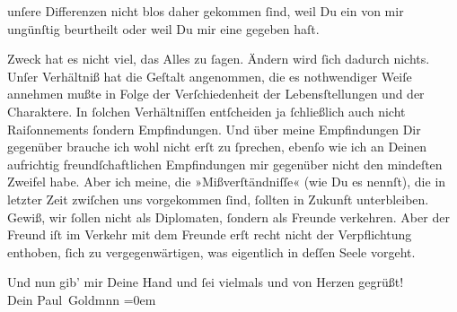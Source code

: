                unſere Differenzen nicht blos daher gekommen ſind, weil Du ein \label{K_L03194-3v}\label{K_L03194-3} von mir ungünſtig beurtheilt  oder weil Du mir eine \label{K_L03194-4v}\label{K_L03194-4} gegeben haſt.\pend
           
\pstart
           Zweck hat es nicht viel, das Alles zu ſagen. Ändern wird ſich dadurch nichts. Unſer
               Verhältniß hat die Geſtalt angenommen, {\pb}die es
               nothwendiger Weiſe annehmen mußte in Folge der Verſchiedenheit der Lebensſtellungen
               und der Charaktere. In ſolchen Verhältniſſen entſcheiden ja ſchließlich auch nicht
               Raiſonnements ſondern Empfindungen. Und über meine Empfindungen Dir gegenüber brauche
               ich wohl nicht erſt zu ſprechen, ebenſo wie ich an Deinen aufrichtig\strikeout{\textcolor{gray}{e}} freundſchaftlichen Empfindungen
                   mir gegenüber nicht den mindeſten Zweifel habe.
               Aber ich meine, die »Mißverſtändniſſe« (wie Du es nennſt), die in letzter Zeit
               zwiſchen uns vorgekommen ſind, ſollten in Zukunft unterbleiben. Gewiß, wir ſollen
               nicht als Diplomaten, ſondern als Freunde verkehren. Aber der Freund iſt im Verkehr mit dem Freunde erſt recht nicht der Verpflichtung
               enthoben, ſich zu vergegenwärtigen, was eigentlich in deſſen Seele vorgeht.\pend
           
\pstart
           Und nun gib’ mir Deine Hand und ſei  vielmals
               und von Herzen gegrüßt! {\\[\baselineskip]}Dein \spacefill\mbox{Paul Goldmnn}\pend
           \leftskip=0em{}\endnumbering{}  
      